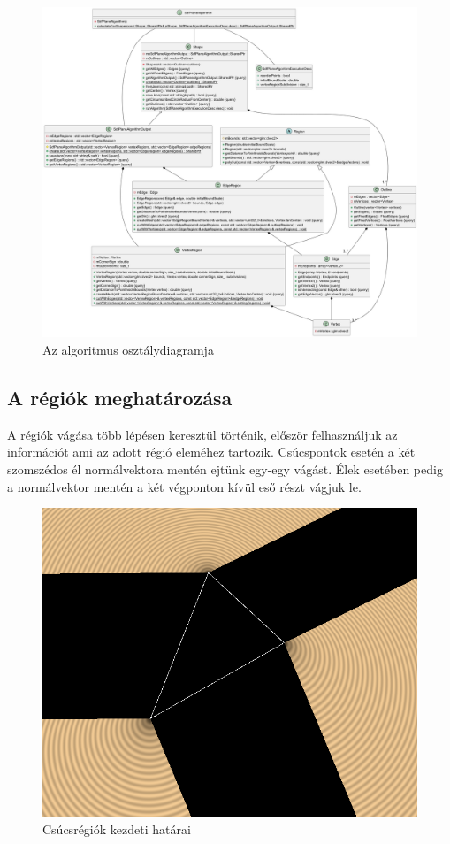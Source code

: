 \begin{figure}[H]
	\centering
	\includegraphics[width=1\linewidth]{images/class_algorithm.png}
	\caption{Az algoritmus osztálydiagramja}
	\label{fig:class_algorithm-1}
\end{figure}

\subsection{A régiók meghatározása}

A régiók vágása több lépésen keresztül történik, először felhasználjuk az információt ami az adott régió eleméhez tartozik. Csúcspontok esetén a két szomszédos él normálvektora mentén ejtünk egy-egy vágást. Élek esetében pedig a normálvektor mentén a két végponton kívül eső részt vágjuk le.

\begin{figure}[H]
	\centering
	\includegraphics[width=.6\linewidth]{images/initial_vertex_regions.png}
	\caption{Csúcsrégiók kezdeti határai}
	\label{fig:initial_vertex_regions-1}
\end{figure}

